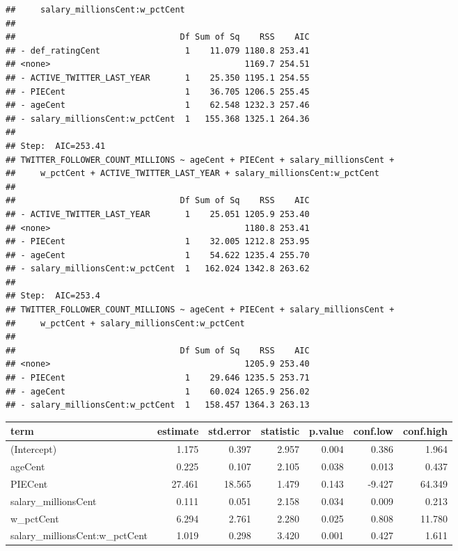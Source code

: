 \documentclass[]{article}
\newenvironment{Shaded}{\begin{snugshade}}{\end{snugshade}}
\newcommand{\DataTypeTok}[1]{\textcolor[rgb]{0.13,0.29,0.53}{#1}}
\newcommand{\DecValTok}[1]{\textcolor[rgb]{0.00,0.00,0.81}{#1}}
\newcommand{\KeywordTok}[1]{\textcolor[rgb]{0.13,0.29,0.53}{\textbf{#1}}}
\newcommand{\NormalTok}[1]{#1}
\newcommand{\OperatorTok}[1]{\textcolor[rgb]{0.81,0.36,0.00}{\textbf{#1}}}
\newcommand{\OtherTok}[1]{\textcolor[rgb]{0.56,0.35,0.01}{#1}}
\newcommand{\StringTok}[1]{\textcolor[rgb]{0.31,0.60,0.02}{#1}}
\begin{document}
\begin{verbatim}
##     salary_millionsCent:w_pctCent
## 
##                                 Df Sum of Sq    RSS    AIC
## - def_ratingCent                 1    11.079 1180.8 253.41
## <none>                                       1169.7 254.51
## - ACTIVE_TWITTER_LAST_YEAR       1    25.350 1195.1 254.55
## - PIECent                        1    36.705 1206.5 255.45
## - ageCent                        1    62.548 1232.3 257.46
## - salary_millionsCent:w_pctCent  1   155.368 1325.1 264.36
## 
## Step:  AIC=253.41
## TWITTER_FOLLOWER_COUNT_MILLIONS ~ ageCent + PIECent + salary_millionsCent + 
##     w_pctCent + ACTIVE_TWITTER_LAST_YEAR + salary_millionsCent:w_pctCent
## 
##                                 Df Sum of Sq    RSS    AIC
## - ACTIVE_TWITTER_LAST_YEAR       1    25.051 1205.9 253.40
## <none>                                       1180.8 253.41
## - PIECent                        1    32.005 1212.8 253.95
## - ageCent                        1    54.622 1235.4 255.70
## - salary_millionsCent:w_pctCent  1   162.024 1342.8 263.62
## 
## Step:  AIC=253.4
## TWITTER_FOLLOWER_COUNT_MILLIONS ~ ageCent + PIECent + salary_millionsCent + 
##     w_pctCent + salary_millionsCent:w_pctCent
## 
##                                 Df Sum of Sq    RSS    AIC
## <none>                                       1205.9 253.40
## - PIECent                        1    29.646 1235.5 253.71
## - ageCent                        1    60.024 1265.9 256.02
## - salary_millionsCent:w_pctCent  1   158.457 1364.3 263.13
\end{verbatim}

\begin{Shaded}
\end{Shaded}

\begin{longtable}[]{@{}lrrrrrr@{}}
\toprule
term & estimate & std.error & statistic & p.value & conf.low &
conf.high\tabularnewline
\midrule
\endhead
(Intercept) & 1.175 & 0.397 & 2.957 & 0.004 & 0.386 &
1.964\tabularnewline
ageCent & 0.225 & 0.107 & 2.105 & 0.038 & 0.013 & 0.437\tabularnewline
PIECent & 27.461 & 18.565 & 1.479 & 0.143 & -9.427 &
64.349\tabularnewline
salary\_millionsCent & 0.111 & 0.051 & 2.158 & 0.034 & 0.009 &
0.213\tabularnewline
w\_pctCent & 6.294 & 2.761 & 2.280 & 0.025 & 0.808 &
11.780\tabularnewline
salary\_millionsCent:w\_pctCent & 1.019 & 0.298 & 3.420 & 0.001 & 0.427
& 1.611\tabularnewline
\bottomrule
\end{longtable}
\end{document}
